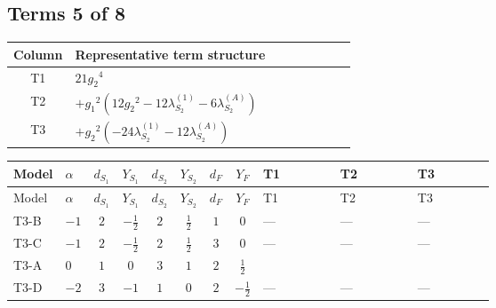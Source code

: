 \documentclass[8pt]{article}
\begin{document}
\begin{landscape}
\subsection*{Terms 5 of 8}
\begin{center}
\begin{tabular}{@{}c >{\raggedright\arraybackslash}p{0.82\linewidth}@{}}
\toprule
Column & Representative term structure \\
\midrule
T1 & \(\displaystyle 21 {g_2}^4\) \\
\midrule
T2 & \(\displaystyle +{g_1}^2 \left(12 {g_2}^2-12 {\lambda_{S_2}^{(1)}}-6 {\lambda_{S_2}^{(A)}}\right)\) \\
\midrule
T3 & \(\displaystyle +{g_2}^2 (-24 {\lambda_{S_2}^{(1)}}-12 {\lambda_{S_2}^{(A)}})\) \\
\midrule
\bottomrule
\end{tabular}
\end{center}
\smallskip
\tiny
\begin{longtable}{@{}llcccccc >{\raggedright\arraybackslash}p{0.21\linewidth} >{\raggedright\arraybackslash}p{0.21\linewidth} >{\raggedright\arraybackslash}p{0.21\linewidth}@{}}
\toprule
Model & $\alpha$ & $d_{S_1}$ & $Y_{S_1}$ & $d_{S_2}$ & $Y_{S_2}$ & $d_F$ & $Y_F$ & T1 & T2 & T3 \\
\midrule
\endfirsthead
\toprule
Model & $\alpha$ & $d_{S_1}$ & $Y_{S_1}$ & $d_{S_2}$ & $Y_{S_2}$ & $d_F$ & $Y_F$ & T1 & T2 & T3 \\
\midrule
\endhead
T3-B & $-1$ & $2$ & $-\frac{1}{2}$ & $2$ & $\frac{1}{2}$ & $1$ & $0$ & --- & --- & --- \\
\midrule
T3-C & $-1$ & $2$ & $-\frac{1}{2}$ & $2$ & $\frac{1}{2}$ & $3$ & $0$ & --- & --- & --- \\
\midrule
T3-A & $0$ & $1$ & $0$ & $3$ & $1$ & $2$ & $\frac{1}{2}$ & \scriptsize\adjustbox{max width=\linewidth}{$\begin{gathered} 21 {g_2}^4\end{gathered}$} & \scriptsize\adjustbox{max width=\linewidth}{$\begin{gathered} +{g_1}^2 \left(12 {g_2}^2-12 {\lambda_{S_2}^{(1)}}-6 {\lambda_{S_2}^{(A)}}\right)\end{gathered}$} & \scriptsize\adjustbox{max width=\linewidth}{$\begin{gathered} +{g_2}^2 (-24 {\lambda_{S_2}^{(1)}}-12 {\lambda_{S_2}^{(A)}})\end{gathered}$} \\
\midrule
T3-D & $-2$ & $3$ & $-1$ & $1$ & $0$ & $2$ & $-\frac{1}{2}$ & --- & --- & --- \\

\end{longtable}
\end{landscape}
\end{document}
